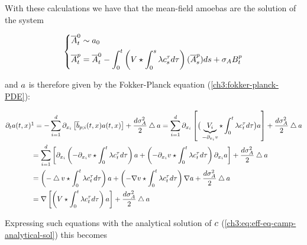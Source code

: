 With these calculations we have that the mean-field amoebas are the solution of the system

\begin{equation}\label{ch3:eff-equ-amoebas}
\left\{
\begin{aligned}
\overline{A}_t^0 &\sim a_0
\\
\overline{A}_t^p &= 
	\overline{A}_t^0 
	- \int_0^t \left( 
		V \star \int_0^s \lambda c_s^\tau 	d \tau
	\right) (\overline{A}_s^p) ds + \sigma_A B_t^p
\end{aligned}
\right.
\end{equation}

and $a$ is therefore given by the Fokker-Planck equation (\ref{ch3:fokker-planck-PDE}):

\begin{equation}
\begin{aligned}
\partial_t \adens(t, x) 
&\footnotemark[1]= 
-
	\sum_{i=1}^d \partial_{x_i} 
		\left[
			\mfdrift_{p;i}(t,x) \adens(t,x)
		\right]
	+ \frac{d\sigma_\amba^2}{2} \bigtriangleup \adens
=  \sum_{i=1}^d \partial_{x_i} 
		\left[
			\big( 
				\underbrace{\attraction_i
					}_{-\partial_{x_i} \potential}
				\star \int_0^t \lambda \cdens_t^\tau 	d \tau
			\big)
			\adens
		\right]
	+ \frac{d\sigma_\amba^2}{2} \bigtriangleup \adens
\\
&= \sum_{i=1}^d
		\left[
			 \partial_{x_i} \left( 
				-\partial_{x_i} \potential
				\star \int_0^t \lambda \cdens_t^\tau 	d \tau
			\right)
			\adens
			+
			 \left( 
				- \partial_{x_i} \potential
				\star \int_0^t \lambda \cdens_t^\tau 	d \tau
			\right)
			\partial_{x_i} \adens
		\right] + \frac{d\sigma_\amba^2}{2} \bigtriangleup \adens
\\
&= \left( - \bigtriangleup \potential
				\star \int_0^t \lambda \cdens_t^\tau 	d \tau
			\right)
			\adens
			+
			 \left( 
				- \nabla \potential
				\star \int_0^t \lambda \cdens_t^\tau 	d \tau
			\right)
			\nabla \adens
		+ \frac{d\sigma_\amba^2}{2} \bigtriangleup \adens
\\
&= \nabla \left[ \left( \attraction
				\star \int_0^t \lambda \cdens_t^\tau 	d \tau
			\right)
			\adens
			\right]
	+ \frac{d\sigma_\amba^2}{2} \bigtriangleup \adens			
\end{aligned}
\end{equation}

Expressing such equations with the analytical solution of $c$ (\ref{ch3:eq:eff-eq-camp-analytical-sol}) this becomes

